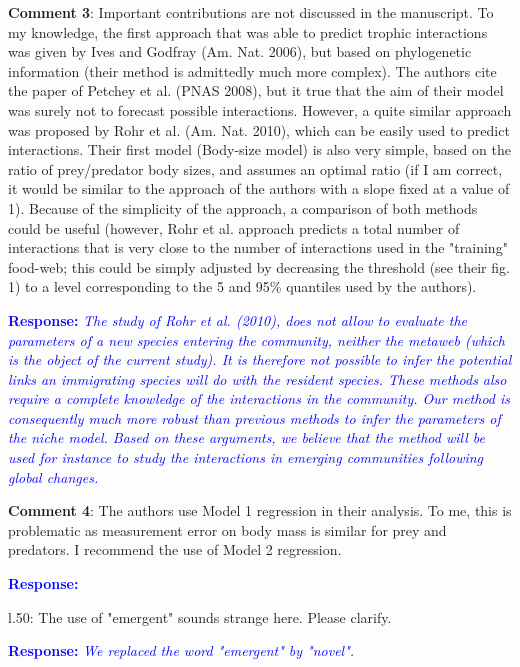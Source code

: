 \documentclass [12pt,onecolumn,twoside,openright]{report}
\begin{document}
\begin{onehalfspacing}
\medskip \textbf{Comment 3}: Important contributions are not
discussed in the manuscript. To my knowledge, the first approach that was able
to predict trophic interactions was given by Ives and Godfray (Am. Nat. 2006),
but based on phylogenetic information (their method is admittedly much more
complex). The authors cite the paper of Petchey et al. (PNAS 2008), but it true
that the aim of their model was surely not to forecast possible interactions.
However, a quite similar approach was proposed by Rohr et al. (Am. Nat. 2010),
which can be easily used to predict interactions. Their first model (Body-size
model) is also very simple, based on the ratio of prey/predator body sizes, and
assumes an optimal ratio (if I am correct, it would be similar to the approach
of the authors with a slope fixed at a value of 1). Because of the simplicity of
the approach, a comparison of both methods could be useful (however, Rohr et al.
approach predicts a total number of interactions that is very close to the
number of interactions used in the "training" food-web; this could be simply
adjusted by decreasing the threshold (see their fig. 1) to a level corresponding
to the 5 and 95\% quantiles used by the authors).

\medskip \textcolor{blue}{\textbf{Response:}} \textit{\textcolor{blue}{The study of Rohr et al. (2010), does not allow to evaluate the parameters of a new species entering the community, neither the metaweb (which is the object of the current study). It is therefore not possible to infer the potential links an immigrating species will do with the resident species. These methods also require a complete knowledge of the interactions in the community. Our method is consequently much more robust than previous methods to infer the parameters of the niche model. Based on these arguments, we believe that the method  will be used for instance to study the interactions in emerging communities following global changes.}}

\medskip \textbf{Comment 4}: The authors use Model 1
regression in their analysis. To me, this is problematic as measurement error on
body mass is similar for prey and predators. I recommend the use of Model 2
regression.

\medskip \textcolor{blue}{\textbf{Response:}} \textit{\textcolor{blue}{}}

\medskip l.50: The use of "emergent" sounds strange here.
Please clarify.

\textcolor{blue}{\textbf{Response:}} \textit{\textcolor{blue}{ We replaced the word "emergent" by "novel".}}


\end{onehalfspacing}
\end{document}
